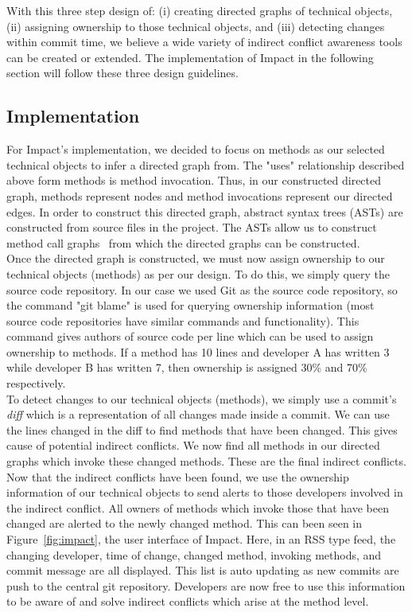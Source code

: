 \documentclass[conference]{IEEEtran}
\begin{document}
With this three step design of: (i) creating directed graphs of technical
objects, (ii) assigning ownership to those technical objects, and (iii)
detecting changes within commit time, we believe a wide variety of
indirect conflict awareness tools can be created or extended. The
implementation of Impact in the following section will follow these
three design guidelines.

\subsection{Implementation}
For Impact's implementation, we decided to focus on methods as our
selected technical objects to infer a directed graph from. The "uses" 
relationship described above form methods is method invocation.
Thus, in our constructed directed graph, methods represent nodes
and method invocations represent our directed edges. In order to 
construct this directed graph, abstract syntax trees (ASTs) are 
constructed from source files in the project. The ASTs allow us
to construct method call graphs~\cite{} from which the directed 
graphs can be constructed.\\

Once the directed graph is constructed, we must now assign
ownership to our technical objects (methods) as per our design.
To do this, we simply query the source code repository. In our case
we used Git as the source code repository, so the command "git blame"
is used for querying ownership information (most source code 
repositories have similar commands and functionality). This command 
gives authors of source code per line which can be used to assign
ownership to methods. If a method has 10 lines and developer A
has written 3 while developer B has written 7, then ownership is
assigned 30\% and 70\% respectively.\\

To detect changes to our technical objects (methods), we simply 
use a commit's \textit{diff} which is a representation of all changes
made inside a commit. We can use the lines changed in the diff to 
find methods that have been changed. This gives cause of potential
indirect conflicts. We now find all methods in our directed graphs
which invoke these changed methods. These are the final indirect
conflicts.\\

Now that the indirect conflicts have been found, we use the
ownership information of our technical objects to send alerts to
those developers involved in the indirect conflict. All owners
of methods which invoke those that have been changed are alerted
to the newly changed method. This can been seen in
Figure~\ref{fig:impact}, the user interface of Impact. Here, in an RSS type
feed, the changing developer, time of change, changed method,
invoking methods, and commit message are all displayed. This 
list is auto updating as new commits are push to the central
git repository. Developers are now free to use this information
to be aware of and solve indirect conflicts which arise at the
method level.\\
\end{document}
